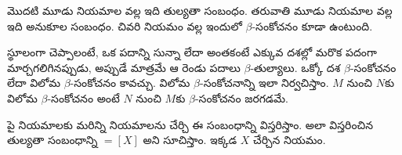 \documentclass[../../../include/open-logic-section]{subfiles}
\begin{document}
మొదటి మూడు నియమాల వల్ల ఇది తుల్యతా సంబంధం. తరువాతి
మూడు నియమాల వల్ల ఇది అనుకూల సంబంధం. చివరి నియమం వల్ల
ఇందులో $\beta$-సంకోచనం కూడా ఉంటుంది.

స్థూలంగా చెప్పాలంటే, ఒక పదాన్ని సున్నా లేదా అంతకంటే ఎక్కువ
దశల్లో మరొక పదంగా మార్చగలిగినప్పుడు, అప్పుడే మాత్రమే ఆ రెండు పదాలు $\beta$-తుల్యాలు.
ఒక్కో దశ $\beta$-సంకోచనం లేదా విలోమ $\beta$-సంకోచనం కావచ్చు.
విలోమ $\beta$-సంకోచనాన్ని ఇలా నిర్వచిస్తాం.
$M$ నుంచి $N$కు విలోమ $\beta$-సంకోచనం అంటే
$N$ నుంచి $M$కు $\beta$-సంకోచనం జరగడమే.

పై నియమాలకు మరిన్ని నియమాలను చేర్చి ఈ సంబంధాన్ని
విస్తరిస్తాం. అలా విస్తరించిన తుల్యతా సంబంధాన్ని
$\equal[X]$ అని సూచిస్తాం. ఇక్కడ $X$ చేర్చిన నియమం.
\end{document}

